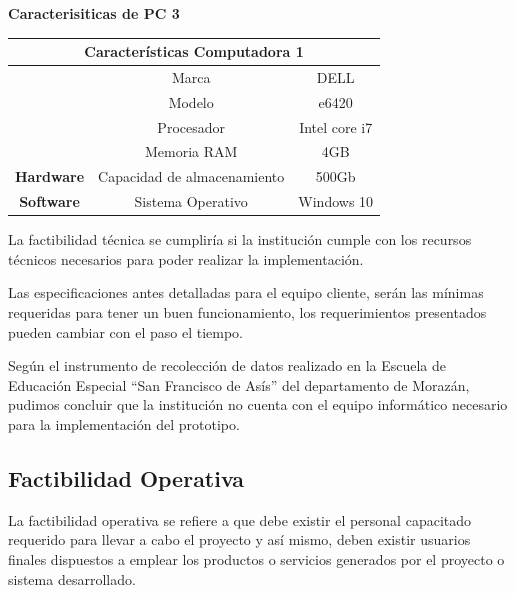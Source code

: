 \documentclass[12pt]{report}%
\begin{document}
\textbf{Caracterisiticas de PC 3}
\begin{table}[htbp]
\begin{tabular}{|c|c|c|}
\hline
\multicolumn{3}{|c|}{\cellcolor[HTML]{68CBD0}\textbf{Características Computadora 1}} \\ \hline
                                     & Marca                        & DELL \\ \cline{2-3} 
                                     & Modelo                       & e6420 \\ \cline{2-3} 
                                     & Procesador                   & Intel core i7  \\ \cline{2-3} 
                                     & Memoria RAM                  & 4GB            \\ \cline{2-3} 
\multirow{-5}{*}{\textbf{Hardware}}  & Capacidad de almacenamiento  & 500Gb          \\ \hline
\textbf{Software}                    & Sistema Operativo            & Windows 10     \\ \hline
\end{tabular}
\end{table}




La factibilidad técnica se cumpliría si la institución cumple con los recursos técnicos necesarios para poder realizar la implementación.

Las especificaciones antes detalladas para el equipo cliente, serán las mínimas requeridas para tener un buen funcionamiento, los requerimientos presentados pueden cambiar con el paso el tiempo.

Según el instrumento de recolección de datos realizado en la Escuela de Educación Especial “San Francisco de Asís” del departamento de Morazán, pudimos concluir que la institución no cuenta con el equipo informático necesario para la implementación del prototipo.

\newpage

\subsection{Factibilidad Operativa}

La factibilidad operativa se refiere a que debe existir el personal capacitado requerido para llevar a cabo el proyecto y así mismo, deben existir usuarios finales dispuestos a emplear los productos o servicios generados por el proyecto o sistema desarrollado. 
\end{document}
